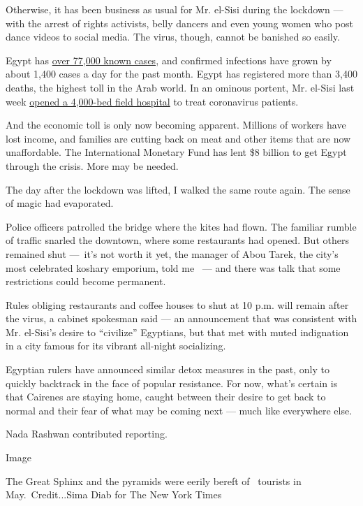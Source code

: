 Otherwise, it has been business as usual for Mr. el-Sisi during the
lockdown --- with the arrest of rights activists, belly dancers and even
young women who post dance videos to social media. The virus, though,
cannot be banished so easily.

Egypt has
\href{https://www.nytimes3xbfgragh.onion/interactive/2020/world/coronavirus-maps.html}{over
77,000 known cases}, and confirmed infections have grown by about 1,400
cases a day for the past month. Egypt has registered more than 3,400
deaths, the highest toll in the Arab world. In an ominous portent, Mr.
el-Sisi last week
\href{http://english.ahram.org.eg/NewsContent/1/64/373091/Egypt/Politics-/Egypts-Sisi-tours-Armed-Forces-medical-isolation-f.aspx}{opened
a 4,000-bed field hospital} to treat coronavirus patients.

And the economic toll is only now becoming apparent. Millions of workers
have lost income, and families are cutting back on meat and other items
that are now unaffordable. The International Monetary Fund has lent \$8
billion to get Egypt through the crisis. More may be needed.

The day after the lockdown was lifted, I walked the same route again.
The sense of magic had evaporated.

Police officers patrolled the bridge where the kites had flown. The
familiar rumble of traffic snarled the downtown, where some restaurants
had opened. But others remained shut ---~it's not worth it yet, the
manager of Abou Tarek, the city's most celebrated koshary emporium, told
me ~--- and there was talk that some restrictions could become
permanent.

Rules obliging restaurants and coffee houses to shut at 10 p.m. will
remain after the virus, a cabinet spokesman said --- an announcement
that was consistent with Mr. el-Sisi's desire to ``civilize'' Egyptians,
but that met with muted indignation in a city famous for its vibrant
all-night socializing.

Egyptian rulers have announced similar detox measures in the past, only
to quickly backtrack in the face of popular resistance. For now, what's
certain is that Cairenes are staying home, caught between their desire
to get back to normal and their fear of what may be coming next --- much
like everywhere else.

Nada Rashwan contributed reporting.

Image

The Great Sphinx and the pyramids were eerily bereft of~ tourists in
May.~Credit...Sima Diab for The New York Times

